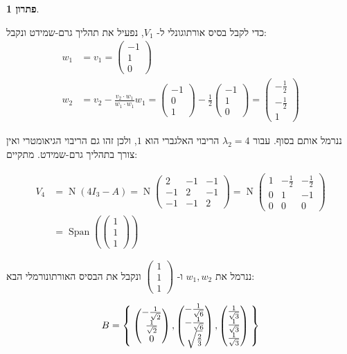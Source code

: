 \documentclass[12pt]{report}
\theoremstyle{plain}
\theoremstyle{definition}
\newtheorem*{solution}{פתרון}
\newcommand{\0}{\mathbf{0}}
\DeclareMathOperator{\Span}{Span}
\DeclareMathOperator{\Null}{N}
\begin{document}
\begin{solution}
\begin{enumerate}[label=\alph*.]
כדי לקבל בסיס אורתוגונלי ל-
$V_1$,
נפעיל את תהליך גרם-שמידט ונקבל:
$$
\begin{aligned}
w_1&=v_1=\begin{pmatrix}-1\\1\\0\end{pmatrix} \\
w_2&=v_2-\frac{v_2\cdot w_1}{w_1\cdot w_1}w_1=\begin{pmatrix}-1\\0\\1\end{pmatrix}-\frac{1}{2}\begin{pmatrix}-1\\1\\0\end{pmatrix}=\begin{pmatrix}-\frac{1}{2}\\-\frac{1}{2}\\1\end{pmatrix}
\end{aligned}
$$

ננרמל אותם בסוף. עבור 
$\lambda_2=4$
הריבוי האלגברי הוא 
$1$,
ולכן זהו גם הריבוי הגיאומטרי ואין צורך בתהליך גרם-שמידט. מתקיים:

$$
\begin{aligned}
V_4&=\Null(4I_3-A)=\Null\begin{pmatrix}
2 & -1 & -1 \\
-1 & 2 & -1 \\
-1 & -1 & 2
\end{pmatrix}=\Null\begin{pmatrix}
1 & -\frac{1}{2} & -\frac{1}{2} \\
0 & 1 & -1 \\
0 & 0 & 0
\end{pmatrix} \\
&=\Span\left(\begin{pmatrix}1\\1\\1\end{pmatrix}\right)
\end{aligned}
$$

ננרמל את 
$w_1,w_2$
ו-
$\begin{pmatrix}1\\1\\1\end{pmatrix}$
ונקבל את הבסיס האורתונורמלי הבא:

$$
B=\Set{\begin{pmatrix}-\frac{1}{\sqrt{2}}\\\frac{1}{\sqrt{2}}\\0\end{pmatrix},\begin{pmatrix}-\frac{1}{\sqrt{6}}\\-\frac{1}{\sqrt{6}}\\\sqrt{\frac{2}{3}}\end{pmatrix},\begin{pmatrix}\frac{1}{\sqrt{3}}\\\frac{1}{\sqrt{3}}\\\frac{1}{\sqrt{3}}\end{pmatrix}}
$$


\end{enumerate}
\end{solution}
\end{document}
